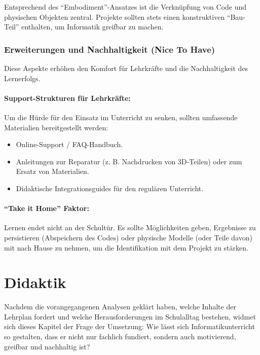 \documentclass[a5paper,pagesize,10pt,bibtotoc,pointlessnumbers,
normalheadings,DIV=9,twoside=false]{scrbook}
\begin{document}
Entsprechend des ``Embodiment''-Ansatzes ist die Verknüpfung von Code und physischen Objekten zentral. Projekte sollten stets einen konstruktiven ``Bau-Teil'' enthalten, um Informatik greifbar zu machen.

\subsection*{Erweiterungen und Nachhaltigkeit (Nice To Have)}

Diese Aspekte erhöhen den Komfort für Lehrkräfte und die Nachhaltigkeit des Lernerfolgs.

\subsubsection{Support-Strukturen für Lehrkräfte:}

Um die Hürde für den Einsatz im Unterricht zu senken, sollten umfassende Materialien bereitgestellt werden:

\begin{itemize}    
    \item Online-Support / FAQ-Handbuch.
    \item Anleitungen zur Reparatur (z. B. Nachdrucken von 3D-Teilen) oder zum Ersatz von Materialien.
    \item Didaktische Integrationsguides für den regulären Unterricht.
\end{itemize}

\subsubsection{``Take it Home'' Faktor:}

Lernen endet nicht an der Schultür. Es sollte Möglichkeiten geben, Ergebnisse zu persistieren (Abspeichern des Codes) oder physische Modelle (oder Teile davon) mit nach Hause zu nehmen, um die Identifikation mit dem Projekt zu stärken.

\chapter{Didaktik}

Nachdem die vorangegangenen Analysen geklärt haben, welche Inhalte der Lehrplan fordert und welche Herausforderungen im Schulalltag bestehen, widmet sich dieses Kapitel der Frage der Umsetzung: Wie lässt sich Informatikunterricht so gestalten, dass er nicht nur fachlich fundiert, sondern auch motivierend, greifbar und nachhaltig ist?
\end{document}
